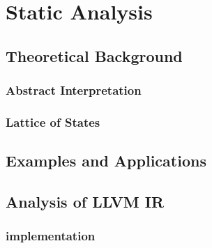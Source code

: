 \chapter{Static Analysis}
\section{Theoretical Background}
\subsection{Abstract Interpretation}
\subsection{Lattice of States}
\section{Examples and Applications}
\section{Analysis of LLVM IR}
\subsection{\Rift implementation}
